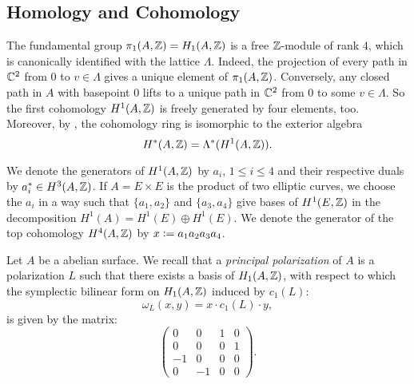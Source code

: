 \subsection{Homology and Cohomology}\label{monodromyexplication}
The fundamental group $\pi_1(A,\mathbb{Z}) = H_1(A,\mathbb{Z})$ is a free $\mathbb{Z}$-module of rank $4$, which is canonically identified with the lattice $\Lambda$. Indeed, the projection of every path in $\mathbb{C}^2$ from $0$ to $v\in \Lambda$ gives a unique element of $\pi_1(A,\mathbb{Z})$. Conversely, any closed path in $A$ with basepoint $0$ lifts to a unique path in $\mathbb{C}^2$ from $0$ to some $v\in\Lambda$.
So the first cohomology $H^1(A,\mathbb{Z})$ is freely generated by four elements, too. Moreover, by \cite[Sect.~I.1]{Mumford}, the cohomology ring is isomorphic to the exterior algebra
$$
H^*(A,\mathbb{Z}) = \Lambda^*(H^1(A,\mathbb{Z})).
$$
\begin{notation} \label{TorusClasses}
We denote the generators of $H^1(A,\mathbb{Z})$ by $a_i$, $1\leq i\leq 4$ and their respective duals by $a_i^*\in H^3(A,\mathbb{Z})$. 
If $A=E\times E$ is the product of two elliptic curves, we choose the $a_i$ in a way such that $\{a_1,a_2\}$ and $\{a_3,a_4\}$ give bases of $H^1(E,\mathbb{Z})$ in the decomposition $H^1(A) = H^1(E)\oplus H^1(E)$.
We denote the generator of the top cohomology $H^4(A,\mathbb{Z})$ by $x \vcentcolon=  a_1 a_2 a_3 a_4$.
\end{notation}



Let $A$ be a abelian surface. We recall that a \emph{principal polarization} of $A$ is a polarization $L$ such that there exists a basis of $H_1(A,\mathbb{Z})$, with respect to which the symplectic bilinear form on $H_1(A,\mathbb{Z})$ induced by $c_1(L)$:
\begin{equation}
\omega_L(x,y)=x\cdot c_1(L)\cdot y,
\label{symplecticprinc}
\end{equation}
is given by the matrix:
$$\left( {\begin{array}{cccc}
   0 & 0 & 1 & 0 \\    0 &  0 & 0 & 1\\ -1 & 0 & 0 & 0\\ 0 & -1 & 0 & 0     
   \end{array} } \right).$$

